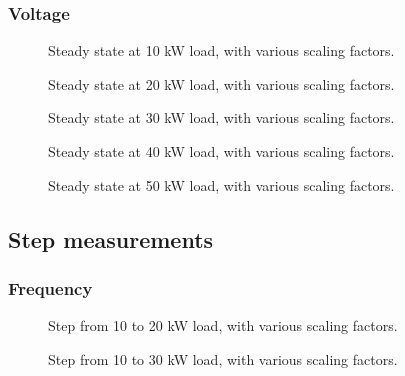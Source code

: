\subsubsection{Voltage}

\begin{figure}[H]
\centering

\caption{Steady state at 10 kW load, with various scaling factors.}
\label{fig:test11-14steadyvolt10kw}
\end{figure}

\begin{figure}[H]
\centering

\caption{Steady state at 20 kW load, with various scaling factors.}
\label{fig:test11-14steadyvolt20kw}
\end{figure}

\begin{figure}[H]
\centering

\caption{Steady state at 30 kW load, with various scaling factors.}
\label{fig:test11-14steadyvolt30kw}
\end{figure}

\begin{figure}[H]
\centering

\caption{Steady state at 40 kW load, with various scaling factors.}
\label{fig:test11-14steadyvolt40kw}
\end{figure}

\begin{figure}[H]
\centering

\caption{Steady state at 50 kW load, with various scaling factors.}
\label{fig:test11-14steadyvolt50kw}
\end{figure}

\subsection{Step measurements}
\subsubsection{Frequency}
\begin{figure}[H]
\centering

\caption{Step from 10 to 20 kW load, with various scaling factors. }
\label{fig:test11-14-10to20kwstepfreq}
\end{figure}

\begin{figure}[H]
\centering

\caption{Step from 10 to 30 kW load, with various scaling factors.}
\label{fig:test11-14-10to30kwstepfreq}
\end{figure}

